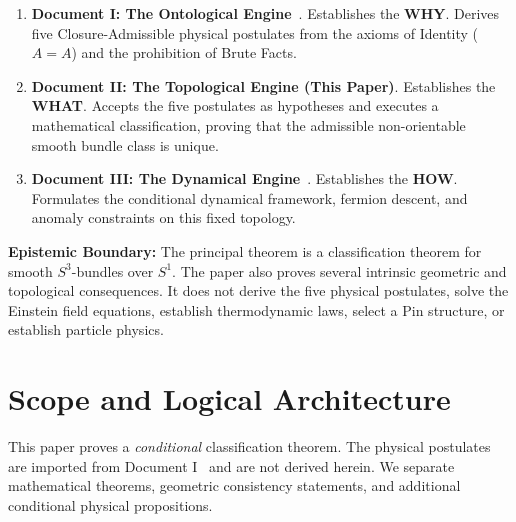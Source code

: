 \documentclass[11pt]{article}
\theoremstyle{canonmath}
\theoremstyle{canonpostulate}
\theoremstyle{canonproposition}
\begin{document}
\begin{enumerate}
    \item \textbf{Document I: The Ontological Engine}~\cite{CanonWhy}. Establishes the \textbf{WHY}. Derives five Closure-Admissible physical postulates from the axioms of Identity ($A=A$) and the prohibition of Brute Facts.
    \item \textbf{Document II: The Topological Engine (This Paper)}. Establishes the \textbf{WHAT}. Accepts the five postulates as hypotheses and executes a mathematical classification, proving that the admissible non-orientable smooth bundle class is unique.
    \item \textbf{Document III: The Dynamical Engine}~\cite{CanonHow}. Establishes the \textbf{HOW}. Formulates the conditional dynamical framework, fermion descent, and anomaly constraints on this fixed topology.
\end{enumerate}

\begin{keyresult}
\textbf{Epistemic Boundary:} The principal theorem is a classification theorem for smooth $S^3$-bundles over $S^1$. The paper also proves several intrinsic geometric and topological consequences. It does not derive the five physical postulates, solve the Einstein field equations, establish thermodynamic laws, select a Pin structure, or establish particle physics.
\end{keyresult}


\newpage
{}
\tableofcontents

\newpage
{}
\setcounter{page}{1}

\section{Scope and Logical Architecture}

This paper proves a \emph{conditional} classification theorem. The physical postulates are imported from Document I~\cite{CanonWhy} and are not derived herein. We separate mathematical theorems, geometric consistency statements, and additional conditional physical propositions.
\end{document}

